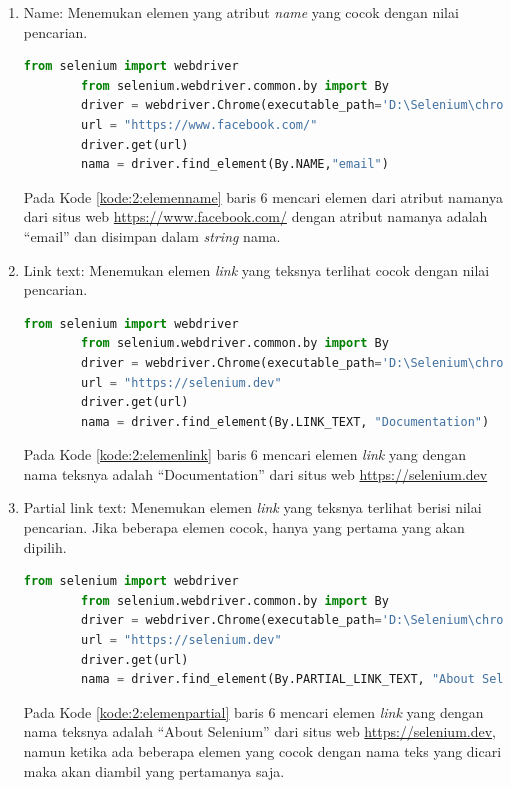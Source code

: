 \begin{enumerate}
	\item Name: Menemukan elemen yang atribut \textit{name} yang cocok dengan nilai pencarian. 
	\begin{lstlisting}[language=python, caption=Contoh kode untuk menemukan elemen dengan atribut nama, label=kode:2:elemenname]
		from selenium import webdriver
		from selenium.webdriver.common.by import By
		driver = webdriver.Chrome(executable_path='D:\Selenium\chromedriver.exe')
		url = "https://www.facebook.com/"
		driver.get(url)
		nama = driver.find_element(By.NAME,"email")
	\end{lstlisting}
	Pada Kode \ref{kode:2:elemenname} baris 6 mencari elemen dari atribut namanya dari situs web \url{https://www.facebook.com/} dengan atribut namanya adalah ``email'' dan disimpan dalam \textit{string} nama.

	\item Link text: Menemukan elemen \textit{link} yang teksnya terlihat cocok dengan nilai pencarian.
	\begin{lstlisting}[language=python, caption=Contoh kode untuk menemukan elemen dengan \textit{link text}, label=kode:2:elemenlink]
		from selenium import webdriver
		from selenium.webdriver.common.by import By
		driver = webdriver.Chrome(executable_path='D:\Selenium\chromedriver.exe')
		url = "https://selenium.dev"
		driver.get(url)
		nama = driver.find_element(By.LINK_TEXT, "Documentation")
	\end{lstlisting}
	Pada Kode \ref{kode:2:elemenlink} baris 6 mencari elemen \textit{link} yang dengan nama teksnya adalah ``Documentation'' dari situs web \url{https://selenium.dev}

	\item Partial link text: Menemukan elemen \textit{link} yang teksnya terlihat berisi nilai pencarian. Jika beberapa elemen cocok, hanya yang pertama yang akan dipilih.
	\begin{lstlisting}[language=python, caption=Contoh kode untuk menemukan elemen dengan \textit{partial link text}, label=kode:2:elemenpartial]
		from selenium import webdriver
		from selenium.webdriver.common.by import By
		driver = webdriver.Chrome(executable_path='D:\Selenium\chromedriver.exe')
		url = "https://selenium.dev"
		driver.get(url)
		nama = driver.find_element(By.PARTIAL_LINK_TEXT, "About Selenium")
	\end{lstlisting}
	Pada Kode \ref{kode:2:elemenpartial} baris 6 mencari elemen \textit{link} yang dengan nama teksnya adalah ``About Selenium'' dari situs web \url{https://selenium.dev}, namun ketika ada beberapa elemen yang cocok dengan nama teks yang dicari maka akan diambil yang pertamanya saja.
	

\end{enumerate}
